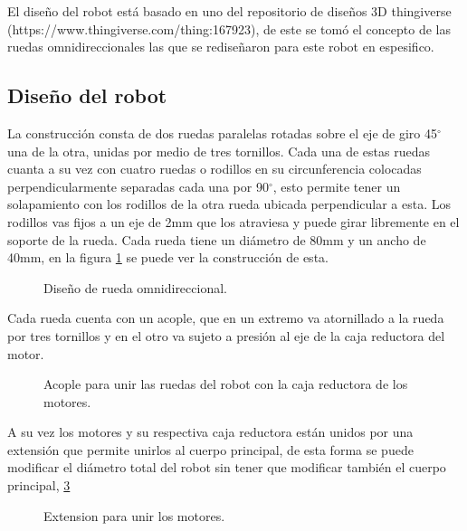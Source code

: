 \documentclass{iccmemoria}
\begin{document}
El diseño del robot está basado en uno del repositorio de diseños 3D thingiverse (https://www.thingiverse.com/thing:167923), de este se tomó el concepto de las ruedas omnidireccionales las que se rediseñaron para este robot en espesifico.\\

\subsection{Diseño del robot}

La construcción consta de dos ruedas paralelas rotadas sobre el eje de giro 45$^{\circ}$ una de la otra, unidas por medio de tres tornillos. Cada una de estas ruedas cuanta a su vez con cuatro ruedas o rodillos en su circunferencia colocadas perpendicularmente separadas cada una por 90$^{\circ}$, esto permite tener un solapamiento con los rodillos de la otra rueda ubicada perpendicular a esta. Los rodillos vas fijos a un eje de 2mm que los atraviesa y puede girar libremente en el soporte de la rueda. Cada rueda tiene un diámetro de 80mm y un ancho de 40mm, en la figura \ref{fig:image_omni_whell_2} se puede ver la construcción de esta.\\

\begin{figure}[H]
  \centering
  
  \caption{Diseño de rueda omnidireccional.}
  \label{fig:image_omni_whell_2}
\end{figure}

Cada rueda cuenta con un acople, que en un extremo va atornillado a la rueda por tres tornillos y en el otro va sujeto a presión al eje de la caja reductora del motor.\\

\begin{figure}[H]
  \centering
  
  \caption{Acople para unir las ruedas del robot con la caja reductora de los motores.}
  \label{fig:arm}
\end{figure}

A su vez los motores y su respectiva caja reductora están unidos por una extensión que permite unirlos al cuerpo principal, de esta forma se puede modificar el diámetro total del robot sin tener que modificar también el cuerpo principal, \ref{fig:arm}\\

\begin{figure}[H]
  \centering
  
  \caption{Extension para unir los motores.}
  \label{fig:arm}
\end{figure}
\end{document}

